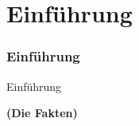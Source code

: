 %

\section{Einführung}
\begin{frame}[fragile]
	\frametitle{Einführung}

	\begin{center}\huge{Einführung}\end{center}
	\begin{center}\huge{\color{typo3darkgrey}\textbf{(Die Fakten)}}\end{center}

\end{frame}


